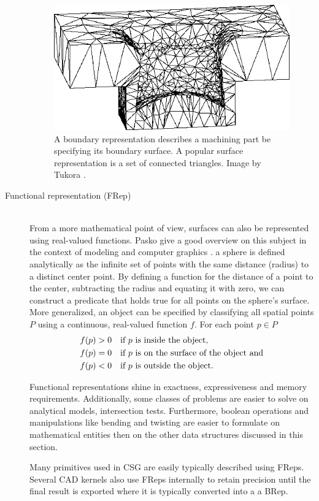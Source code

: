 \begin{description}
	\begin{figure}[h]
		\centering
		\includegraphics[width=\textwidth]{images/brep}
		\caption{
			A boundary representation describes a machining part be specifying its boundary surface. A popular surface representation is a set of connected triangles. 
			Image by Tukora \cite{virtual_machining_review}. 
		}
		\label{fig:brep}
	\end{figure}
	
	\item[Functional representation (FRep)] \hfill \\
	From a more mathematical point of view, surfaces can also be represented using real-valued functions.
	Pasko \etal give a good overview on this subject in the context of modeling and computer graphics \cite{frep}.
	\Eg a sphere is defined analytically as the infinite set of points with the same distance (radius) to a distinct center point.
	By defining a function for the distance of a point to the center, subtracting the radius and equating it with zero, we can construct a predicate that holds true for all points on the sphere's surface.
	More generalized, an object can be specified by classifying all spatial points $P$ using a continuous, real-valued function $f$. For each point $p \in P$
	\begin{align}
		f(p) &> 0 \quad \text{if $p$ is inside the object,}               \notag \\
		f(p) &= 0 \quad \text{if $p$ is on the surface of the object and} \notag \\
		f(p) &< 0 \quad \text{if $p$ is outside the object.}              \notag
	\end{align}
	
	Functional representations shine in exactness, expressiveness and memory requirements.
	Additionally, some classes of problems are easier to solve on analytical models, \eg intersection tests.
	Furthermore, boolean operations and manipulations like bending and twisting are easier to formulate on mathematical entities then on the other data structures discussed in this section.
	
	Many primitives used in CSG are easily typically described using FReps.
	Several CAD kernels also use FReps internally to retain precision until the final result is exported where it is typically converted into a \eg a BRep.
	
\end{description}
